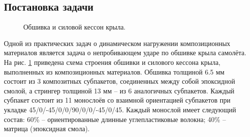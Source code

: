 \subsection*{Постановка задачи}
\begin{figure}[h]
\caption{Обшивка и силовой кессон крыла.}
\label{pic:construction}
\end{figure}
Одной из практических задач о динамическом нагружении композиционных материалов
является задача о непробивающем ударе по обшивке крыла самолёта. На рис.
\ref{pic:construction} приведена схема строения обшивки и силового кессона
крыла, выполненных из композиционных материалов. Обшивка толщиной 6.5 мм состоит 
из 3 композитных субпакетов, соединенных между собой эпоксидной смолой, 
а стрингер толщиной 13 мм -- из 6 аналогичных субпакетов. Каждый субпакет
состоит из 11 монослоёв со взаимной ориентацией субпакетов при укладке 
45/0/-45/0/0/90/0/0/-45/0/45. Каждый монослой имеет следующий состав: 60\% -- 
ориентированные длинные углепластиковые волокна; 40\% -- матрица
(эпоксидная смола). 

